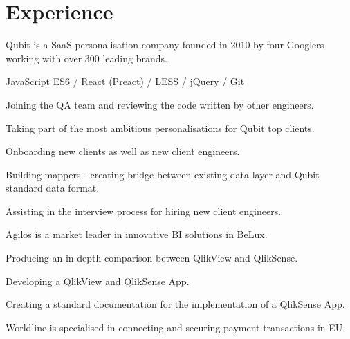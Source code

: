 \documentclass[]{my-resume}
\begin{document}
\begin{minipage}[t]{0.66\textwidth} 


\section{Experience}

Qubit is a SaaS personalisation company founded in 2010 by four Googlers working with over 300 leading brands.
\vspace{\topsep} %
\begin{tightemize}
\item JavaScript ES6 / React (Preact) / LESS / jQuery / Git
\item Joining the QA team and reviewing the code written by other engineers.
\item Taking part of the most ambitious personalisations for Qubit top clients.
\item Onboarding new clients as well as new client engineers.
\item Building mappers - creating bridge between existing data layer and Qubit standard data format.
\item Assisting in the interview process for hiring new client engineers.
\end{tightemize}
\sectionsep

Agilos is a market leader in innovative BI solutions in BeLux.
\begin{tightemize}
\item Producing an in-depth comparison between QlikView and QlikSense.
\item Developing a QlikView and QlikSense App.
\item Creating a standard documentation for the implementation of a QlikSense App.
\end{tightemize}
\sectionsep

Worldline is specialised in connecting and securing payment transactions in EU.
\sectionsep


\end{minipage}
\end{document}
